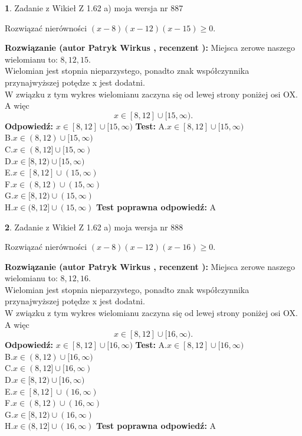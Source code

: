\documentclass[12pt, a4paper]{article}
\theoremstyle{definition} %
\newtheorem{zad}{}
\newcommand{\zadStart}[1]{\begin{zad}#1\newline}
\newcommand{\zadStop}{\end{zad}}
\newcommand{\rozwStart}[2]{\noindent \textbf{Rozwiązanie (autor #1 , recenzent #2): }\newline}
\newcommand{\rozwStop}{\newline}
\newcommand{\odpStart}{\noindent \textbf{Odpowiedź:}\newline}
\newcommand{\odpStop}{\newline}
\newcommand{\testStart}{\noindent \textbf{Test:}\newline}
\newcommand{\testStop}{\newline}
\newcommand{\kluczStart}{\noindent \textbf{Test poprawna odpowiedź:}\newline}
\newcommand{\kluczStop}{\newline}
\begin{document}
\zadStart{Zadanie z Wikieł Z 1.62 a) moja wersja nr 887}

Rozwiązać nierówności $(x-8)(x-12)(x-15)\ge0$.
\zadStop
\rozwStart{Patryk Wirkus}{}
Miejsca zerowe naszego wielomianu to: $8, 12, 15$.\\
Wielomian jest stopnia nieparzystego, ponadto znak współczynnika przy\linebreak najwyższej potędze x jest dodatni.\\ W związku z tym wykres wielomianu zaczyna się od lewej strony poniżej osi OX. A więc $$x \in [8,12] \cup [15,\infty).$$
\rozwStop
\odpStart
$x \in [8,12] \cup [15,\infty)$
\odpStop
\testStart
A.$x \in [8,12] \cup [15,\infty)$\\
B.$x \in (8,12) \cup [15,\infty)$\\
C.$x \in (8,12] \cup [15,\infty)$\\
D.$x \in [8,12) \cup [15,\infty)$\\
E.$x \in [8,12] \cup (15,\infty)$\\
F.$x \in (8,12) \cup (15,\infty)$\\
G.$x \in [8,12) \cup (15,\infty)$\\
H.$x \in (8,12] \cup (15,\infty)$
\testStop
\kluczStart
A
\kluczStop



\zadStart{Zadanie z Wikieł Z 1.62 a) moja wersja nr 888}

Rozwiązać nierówności $(x-8)(x-12)(x-16)\ge0$.
\zadStop
\rozwStart{Patryk Wirkus}{}
Miejsca zerowe naszego wielomianu to: $8, 12, 16$.\\
Wielomian jest stopnia nieparzystego, ponadto znak współczynnika przy\linebreak najwyższej potędze x jest dodatni.\\ W związku z tym wykres wielomianu zaczyna się od lewej strony poniżej osi OX. A więc $$x \in [8,12] \cup [16,\infty).$$
\rozwStop
\odpStart
$x \in [8,12] \cup [16,\infty)$
\odpStop
\testStart
A.$x \in [8,12] \cup [16,\infty)$\\
B.$x \in (8,12) \cup [16,\infty)$\\
C.$x \in (8,12] \cup [16,\infty)$\\
D.$x \in [8,12) \cup [16,\infty)$\\
E.$x \in [8,12] \cup (16,\infty)$\\
F.$x \in (8,12) \cup (16,\infty)$\\
G.$x \in [8,12) \cup (16,\infty)$\\
H.$x \in (8,12] \cup (16,\infty)$
\testStop
\kluczStart
A
\kluczStop
\end{document}
